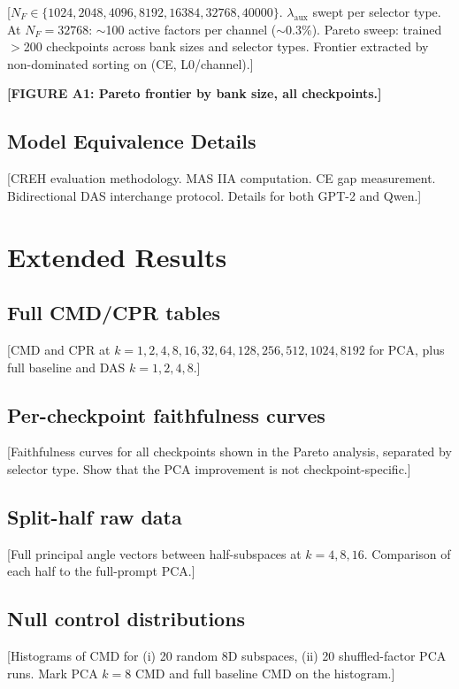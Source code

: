 \documentclass[11pt]{article}
\begin{document}
[$N_F \in \{1024, 2048, 4096, 8192, 16384, 32768, 40000\}$.
$\lambda_{\text{aux}}$ swept per selector type.
At $N_F = 32768$: $\sim$100 active factors per channel ($\sim$0.3\%).
Pareto sweep: trained $>$200 checkpoints across bank sizes and selector
types. Frontier extracted by non-dominated sorting on (CE, L0/channel).]

\textbf{[FIGURE A1: Pareto frontier by bank size, all checkpoints.]}

\subsection{Model Equivalence Details}
[CREH evaluation methodology. MAS IIA computation. CE gap measurement.
Bidirectional DAS interchange protocol. Details for both GPT-2 and Qwen.]



\section{Extended Results}

\subsection{Full CMD/CPR tables}
[CMD and CPR at $k = 1, 2, 4, 8, 16, 32, 64, 128, 256, 512, 1024, 8192$
for PCA, plus full baseline and DAS $k=1,2,4,8$.]

\subsection{Per-checkpoint faithfulness curves}
[Faithfulness curves for all checkpoints shown in the Pareto analysis,
separated by selector type. Show that the PCA improvement is not
checkpoint-specific.]

\subsection{Split-half raw data}
[Full principal angle vectors between half-subspaces at $k=4,8,16$.
Comparison of each half to the full-prompt PCA.]

\subsection{Null control distributions}
[Histograms of CMD for (i) 20 random 8D subspaces, (ii) 20 shuffled-factor
PCA runs. Mark PCA $k=8$ CMD and full baseline CMD on the histogram.]
\end{document}
